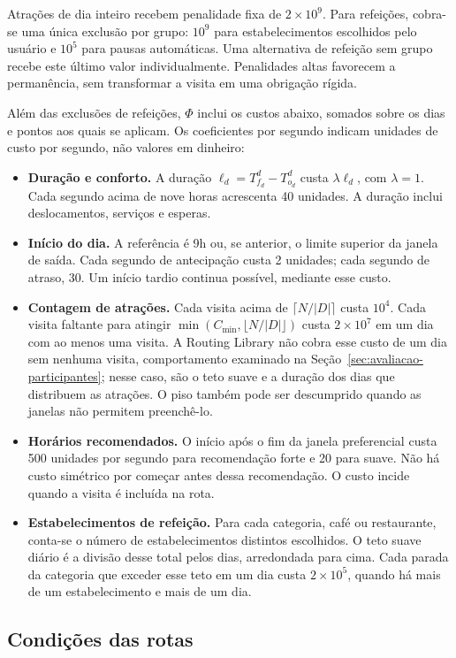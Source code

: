 Atrações de dia inteiro recebem penalidade fixa de $2\times10^9$. Para refeições, cobra-se uma única exclusão por grupo: $10^9$ para estabelecimentos escolhidos pelo usuário e $10^5$ para pausas automáticas. Uma alternativa de refeição sem grupo recebe este último valor individualmente. Penalidades altas favorecem a permanência, sem transformar a visita em uma obrigação rígida.

Além das exclusões de refeições, $\Phi$ inclui os custos abaixo, somados sobre os dias e pontos aos quais se aplicam. Os coeficientes por segundo indicam unidades de custo por segundo, não valores em dinheiro:
\begin{itemize}
  \item \textbf{Duração e conforto.} A duração $\ell_d=T_{f_d}^d-T_{o_d}^d$ custa $\lambda\ell_d$, com $\lambda=1$. Cada segundo acima de nove horas acrescenta 40 unidades. A duração inclui deslocamentos, serviços e esperas.
  \item \textbf{Início do dia.} A referência é 9h ou, se anterior, o limite superior da janela de saída. Cada segundo de antecipação custa 2 unidades; cada segundo de atraso, 30. Um início tardio continua possível, mediante esse custo.
  \item \textbf{Contagem de atrações.} Cada visita acima de $\lceil N/|D|\rceil$ custa $10^4$. Cada visita faltante para atingir $\min(C_{\min},\lfloor N/|D|\rfloor)$ custa $2\times10^7$ em um dia com ao menos uma visita. A Routing Library não cobra esse custo de um dia sem nenhuma visita, comportamento examinado na Seção~\ref{sec:avaliacao-participantes}; nesse caso, são o teto suave e a duração dos dias que distribuem as atrações. O piso também pode ser descumprido quando as janelas não permitem preenchê-lo.
  \item \textbf{Horários recomendados.} O início após o fim da janela preferencial custa 500 unidades por segundo para recomendação forte e 20 para suave. Não há custo simétrico por começar antes dessa recomendação. O custo incide quando a visita é incluída na rota.
  \item \textbf{Estabelecimentos de refeição.} Para cada categoria, café ou restaurante, conta-se o número de estabelecimentos distintos escolhidos. O teto suave diário é a divisão desse total pelos dias, arredondada para cima. Cada parada da categoria que exceder esse teto em um dia custa $2\times10^5$, quando há mais de um estabelecimento e mais de um dia.
\end{itemize}

\subsection*{Condições das rotas}

